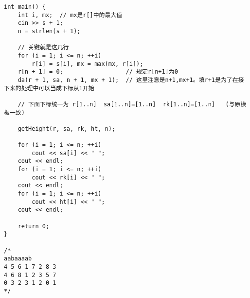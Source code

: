 \begin{lstlisting}
int main() {
    int i, mx;  // mx是r[]中的最大值
    cin >> s + 1;
    n = strlen(s + 1);

    // 关键就是这几行
    for (i = 1; i <= n; ++i)
        r[i] = s[i], mx = max(mx, r[i]);
    r[n + 1] = 0;                  // 规定r[n+1]为0
    da(r + 1, sa, n + 1, mx + 1);  // 这里注意是n+1,mx+1。填r+1是为了在接下来的处理中可以当成下标从1开始

    // 下面下标统一为 r[1..n]  sa[1..n]=[1..n]  rk[1..n]=[1..n]   (与原模板一致)

    getHeight(r, sa, rk, ht, n);

    for (i = 1; i <= n; ++i)
        cout << sa[i] << " ";
    cout << endl;
    for (i = 1; i <= n; ++i)
        cout << rk[i] << " ";
    cout << endl;
    for (i = 1; i <= n; ++i)
        cout << ht[i] << " ";
    cout << endl;

    return 0;
}

/*
aabaaaab
4 5 6 1 7 2 8 3
4 6 8 1 2 3 5 7
0 3 2 3 1 2 0 1
*/
\end{lstlisting}
